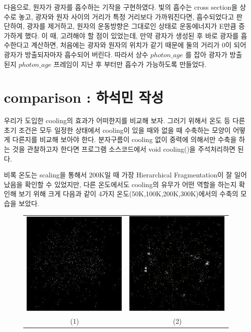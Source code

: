 \documentclass{gshs-hutech}
\begin{document}
다음으로, 원자가 광자를 흡수하는 기작을 구현하였다. 빛의 흡수는 cross section을 상수로 놓고, 광자와 원자 사이의 거리가 특정 거리보다 가까워진다면, 흡수되었다고 판단하여, 광자를 제거하고, 원자의 운동방향은 그대로인 상태로 운동에너지가 E만큼 증가하게 했다. 이 때, 고려해야 할 점이 있었는데, 만약 광자가 생성된 후 바로 광자를 흡수한다고 계산하면, 처음에는 광자와 원자의 위치가 같기 때문에 둘의 거리가 $0$이 되어 광자가 방출되자마자 흡수되어 버린다. 따라서 상수 $photon\_age$ 를 잡아 광자가 방출된지 $photon\_age$ 프레임이 지난 후 부터만 흡수가 가능하도록 만들었다.
 

\section{comparison : 하석민 작성} \label{comparison}

우리가 도입한 cooling의 효과가 어떠한지를 비교해 보자. 그러기 위해서 온도 등 다른 초기 조건은 모두 일정한 상태에서 cooling이 있을 때와 없을 때 수축하는 모양이 어떻게 다른지를 비교해 보아야 한다. 분자구름이 cooling 없이 중력에 의해서만 수축을 하는 것을 관찰하고자 한다면 프로그램 소스코드에서 void cooling()을 주석처리하면 된다.

비록 온도는 scaling을 통해서 200K일 때 가장 Hierarchical Fragmentation이 잘 일어났음을 확인할 수 있었지만, 다른 온도에서도 cooling의 유무가 어떤 역할을 하는지 확인해 보기 위해 크게 다음과 같이 4가지 온도(50K,100K,200K,300K)에서의 수축의 모습을 보았다.

\begin{figure}[h]
	\centering
	\begin{tabular}{cc}
		\includegraphics[scale=0.8]{c_1.jpg}&
		\includegraphics[scale=0.8]{c_2.jpg}\\
		(1) & (2)
	\end{tabular}
\end{figure} 
		
\end{document}
